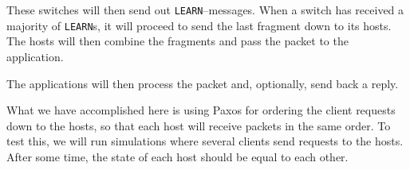 These switches will then send out \texttt{LEARN}--messages.
When a switch has received a majority of \texttt{LEARN}s, it will proceed to
send the last fragment down to its hosts.  The hosts will then combine the
fragments and pass the packet to the application.

The applications will then process the packet and, optionally, send back a
reply.


What we have accomplished here is using Paxos for ordering the client
requests down to the hosts, so that each host will receive packets in the
same order.  To test this, we will run simulations where several clients
send requests to the hosts. After some time, the state of each host should
be equal to each other.

